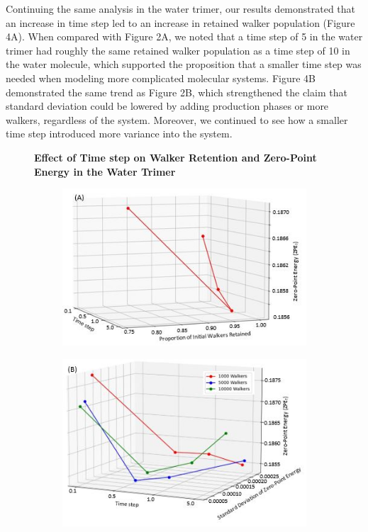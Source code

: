 \documentclass[journal=jacsat,manuscript=article]{achemso}
\newcommand*{\figuretitle}[1]{%
    {\centering%
    \textbf{#1}%
    \par\medskip}%
}
\begin{document}
Continuing the same analysis in the water trimer, our results demonstrated that an increase in time step led to an increase in retained walker population (Figure 4A). When compared with Figure 2A, we noted that a time step of 5 in the water trimer had roughly the same retained walker population as a time step of 10 in the water molecule, which supported the proposition that a smaller time step was needed when modeling more complicated molecular systems. Figure 4B demonstrated the same trend as Figure 2B, which strengthened the claim that standard deviation could be lowered by adding production phases or more walkers, regardless of the system. Moreover, we continued to see how a smaller time step introduced more variance into the system. 

\begin{figure}[H]
\centering
\figuretitle{Effect of Time step on Walker Retention and Zero-Point Energy in the Water Trimer}
\begin{subfigure}{.5\textwidth}
 \centering
\includegraphics[width=\linewidth]{figures/fig_4A.jpg}
\end{subfigure}%
\begin{subfigure}{.5\textwidth}
 \centering
 \includegraphics[width=\linewidth]{figures/fig_4B.jpg}

\end{subfigure}
\end{figure}
\end{document}
